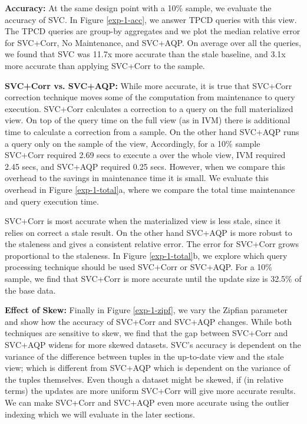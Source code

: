 \textbf{Accuracy: }
At the same design point with a 10\% sample, we evaluate the accuracy of SVC.
In Figure \ref{exp-1-acc}, we answer TPCD queries with this view.
The TPCD queries are group-by aggregates and we plot the median relative error for SVC+Corr, No Maintenance, and SVC+AQP.
On average over all the queries, we found that SVC was 11.7x more accurate than the stale baseline, and 3.1x more accurate than applying SVC+Corr to the sample.

\textbf{SVC+Corr vs. SVC+AQP: }
While more accurate, it is true that SVC+Corr correction technique moves some of the computation from maintenance to query execution.
SVC+Corr calculates a correction to a query on the full materialized view.
On top of the query time on the full view (as in IVM) there is additional time to calculate a correction from a sample.
On the other hand SVC+AQP runs a query only on the sample of the view, 
Accordingly, for a 10\% sample SVC+Corr required 2.69 secs to execute a \sumfunc over the whole view, IVM required 2.45 secs, and  SVC+AQP required 0.25 secs.
However, when we compare this overhead to the savings in maintenance time it is small.
We evaluate this overhead in Figure \ref{exp-1-total}a, where we compare the total time maintenance and query execution time.

SVC+Corr is most accurate when the materialized view is less stale, since it relies on correct a stale result.
On the other hand SVC+AQP is more robust to the staleness and gives a consistent relative error.
The error for SVC+Corr grows proportional to the staleness.
In Figure \ref{exp-1-total}b, we explore which query processing technique should be used SVC+Corr or SVC+AQP.
For a 10\% sample, we find that SVC+Corr is more accurate until the update size is 32.5\% of the base data.

\textbf{Effect of Skew: }
Finally in Figure \ref{exp-1-zipf}, we vary the Zipfian parameter and show how the accuracy of SVC+Corr and SVC+AQP changes.
While both techniques are sensitive to skew, we find that the gap between SVC+Corr and SVC+AQP widens for more skewed datasets. 
SVC's accuracy is dependent on the variance of the difference between tuples in the up-to-date view and the stale view; which is different from SVC+AQP which is dependent on the variance of the tuples themselves. 
Even though a dataset might be skewed, if (in relative terms) the updates are more uniform SVC+Corr will give more accurate results.
We can make SVC+Corr and SVC+AQP even more accurate using the outlier indexing which we will evaluate in the later sections.

